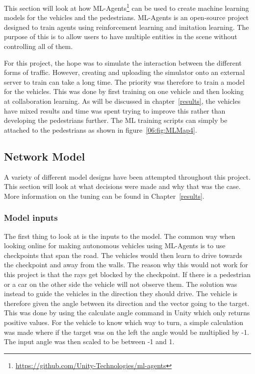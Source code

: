 This section will look at how ML-Agents\footnote{\url{https://github.com/Unity-Technologies/ml-agents}} can be used to create machine learning models for the vehicles and the pedestrians. ML-Agents is an open-source project designed to train agents using reinforcement learning and imitation learning. The purpose of this is to allow users to have multiple entities in the scene without controlling all of them. 

For this project, the hope was to simulate the interaction between the different forms of traffic. However, creating and uploading the simulator onto an external server to train can take a long time. The priority was therefore to train a model for the vehicles. This was done by first training on one vehicle and then looking at collaboration learning.  As will be discussed in chapter~\ref{results}, the vehicles have mixed results and time was spent trying to improve this rather than developing the pedestrians further. The ML training scripts can simply be attached to the pedestrians as shown in figure~\ref{06:fig:MLMap4}.  

\subsection{Network Model}
A variety of different model designs have been attempted throughout this project. This section will look at what decisions were made and why that was the case. More information on the tuning can be found in Chapter~\ref{results}.

\subsubsection{Model inputs}
The first thing to look at is the inputs to the model. The common way when looking online for making autonomous vehicles using ML-Agents is to use checkpoints that span the road. The vehicles would then learn to drive towards the checkpoint and away from the walls. The reason why this would not work for this project is that the rays get blocked by the checkpoint. If there is a pedestrian or a car on the other side the vehicle will not observe them. The solution was instead to guide the vehicles in the direction they should drive. The vehicle is therefore given the angle between its direction and the vector going to the target. This was done by using the calculate angle command in Unity which only returns positive values. For the vehicle to know which way to turn, a simple calculation was made where if the target was on the left the angle would be multiplied by -1. The input angle was then scaled to be between -1 and 1. 

